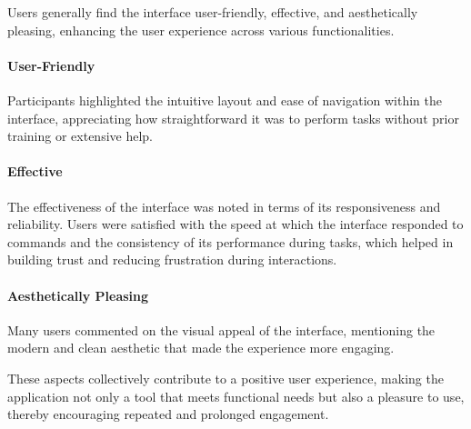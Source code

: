 Users generally find the interface user-friendly, effective, and aesthetically pleasing, enhancing the user experience across various functionalities. 

\paragraph{User-Friendly} 
Participants highlighted the intuitive layout and ease of navigation within the interface, appreciating how straightforward it was to perform tasks without prior training or extensive help. 
\cite{P1, P2, P4, P5, P7, P8, P10}

 
\paragraph{Effective} 
The effectiveness of the interface was noted in terms of its responsiveness and reliability. 
Users were satisfied with the speed at which the interface responded to commands and the consistency of its performance during tasks, which helped in building trust and reducing frustration during interactions.
\cite{P2, P4, P7, P8, P10}



\paragraph{Aesthetically Pleasing} 
Many users commented on the visual appeal of the interface, mentioning the modern and clean aesthetic that made the experience more engaging. 
\cite{P7, P8, P10}


These aspects collectively contribute to a positive user experience, making the application not only a tool that meets functional needs but also a pleasure to use, thereby encouraging repeated and prolonged engagement.

